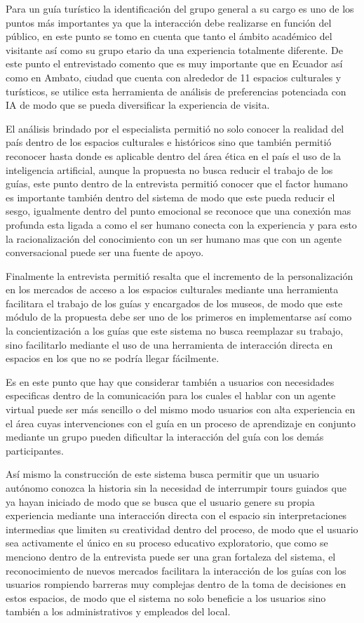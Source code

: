 \documentclass[pdflatex,sn-mathphys-num]{sn-jnl}%
\theoremstyle{thmstyleone}%
\theoremstyle{thmstyletwo}%
\theoremstyle{thmstylethree}%
\begin{document}
Para un guía turístico la identificación del grupo general a su cargo es uno de los puntos más importantes ya que la interacción debe realizarse en función del público, en este punto se tomo en cuenta que tanto el ámbito académico del visitante así como su grupo etario da una experiencia totalmente diferente. De este punto el entrevistado comento que es muy importante que en Ecuador así como en Ambato, ciudad que cuenta con alrededor de 11 espacios culturales y turísticos, se utilice esta herramienta de análisis de preferencias potenciada con IA de modo que se pueda diversificar la experiencia de visita.

El análisis brindado por el especialista permitió no solo conocer la realidad del país dentro de los espacios culturales e históricos sino que también permitió reconocer hasta donde es aplicable dentro del área ética en el país el uso de la inteligencia artificial, aunque la propuesta no busca reducir el trabajo de los guías, este punto dentro de la entrevista permitió conocer que el factor humano es importante también dentro del sistema de modo que este pueda reducir el sesgo, igualmente dentro del punto emocional se reconoce que una conexión mas profunda esta ligada a como el ser humano conecta con la experiencia y para esto la racionalización del conocimiento con un ser humano mas que con un agente conversacional puede ser una fuente de apoyo.

Finalmente la entrevista permitió resalta que el incremento de la personalización en los mercados de acceso a los espacios culturales mediante una herramienta facilitara el trabajo de los guías y encargados de los museos, de modo que este módulo de la propuesta debe ser uno de los primeros en implementarse así como la concientización a los guías que este sistema no busca reemplazar su trabajo, sino facilitarlo mediante el uso de una herramienta de interacción directa en espacios en los que no se podría llegar fácilmente.

Es en este punto que hay que considerar también a usuarios con necesidades especificas dentro de la comunicación para los cuales el hablar con un agente virtual puede ser más sencillo o del mismo modo usuarios con alta experiencia en el área cuyas intervenciones con el guía en un proceso de aprendizaje en conjunto mediante un grupo pueden dificultar la interacción del guía con los demás participantes.

Así mismo la construcción de este sistema busca permitir que un usuario autónomo conozca la historia sin la necesidad de interrumpir tours guiados que ya hayan iniciado de modo que se busca que el usuario genere su propia experiencia mediante una interacción directa con el espacio sin interpretaciones intermedias que limiten su creatividad dentro del proceso, de modo que el usuario sea activamente el único en su proceso educativo exploratorio, que como se menciono dentro de la entrevista puede ser una gran fortaleza del sistema, el reconocimiento de nuevos mercados facilitara la interacción de los guías con los usuarios rompiendo barreras muy complejas dentro de la toma de decisiones en estos espacios, de modo que el sistema no solo beneficie a los usuarios sino también a los administrativos y empleados del local.
\end{document}
